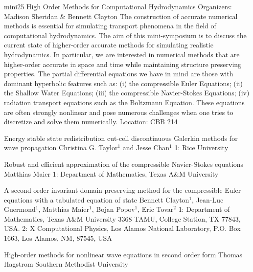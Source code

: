 \mini
{mini25}
{High Order Methods for Computational Hydrodynamics}
{Organizers: Madison Sheridan \& Bennett Clayton}
{The construction of accurate numerical methods is essential for simulating transport phenomena in the field of computational hydrodynamics. The aim of this mini-symposium is to discuss the current state of higher-order accurate methods for simulating realistic hydrodynamics. In particular, we are interested in numerical methods that are higher-order accurate in space and time while maintaining structure preserving properties. The partial differential equations we have in mind are those with dominant hyperbolic features such as: (i) the compressible Euler Equations; (ii) the Shallow Water Equations; (iii) the compressible Navier-Stokes Equations; (iv) radiation transport equations such as the Boltzmann Equation. These equations are often strongly nonlinear and pose numerous challenges when one tries to discretize and solve them numerically.}
{Location: CBB 214}

\begin{talks}
\item\talk
{Energy stable state redistribution cut-cell discontinuous Galerkin methods for wave propagation}
{Christina G. Taylor$^{1}$ and Jesse Chan$^{1}$}
{1: Rice University}
\item\talk
{Robust and efficient approximation of the compressible Navier-Stokes equations}
{Matthias Maier}
{1: Department of Mathematics, Texas A\&M University}
\item\talk
{A second order invariant domain preserving method for the compressible Euler equations with a tabulated equation of state}
{Bennett Clayton$^{1}$, Jean-Luc Guermond$^{1}$, Matthias Maier$^{1}$, Bojan Popov$^{1}$, Eric Tovar$^{2}$}
{1: Department of Mathematics, Texas A\&M University 3368 TAMU, College Station, TX 77843, USA. 2: X Computational Physics, Los Alamos National Laboratory, P.O. Box 1663, Los Alamos, NM, 87545, USA}
\item\talk
{High-order methods for nonlinear wave equations in second order form}
{Thomas Hagstrom}
{Southern Methodist University}
\end{talks}
\room
